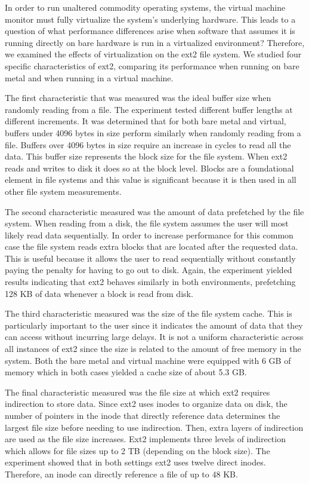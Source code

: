 \documentclass[letterpaper,twocolumn,10pt]{article}
\begin{document}
In order to run unaltered commodity operating systems, the virtual machine monitor must fully virtualize the system's underlying hardware.
This leads to a question of what performance differences arise when software that assumes it is running directly on bare hardware is run in a virtualized environment?
Therefore, we examined the effects of virtualization on the ext2 file system.
We studied four specific characteristics of ext2, comparing its performance when running on bare metal and when running in a virtual machine.

The first characteristic that was measured was the ideal buffer size when randomly reading from a file. 
The experiment tested different buffer lengths at different increments. 
It was determined that for both bare metal and virtual, buffers under 4096 bytes in size perform similarly when randomly reading from a file. 
Buffers over 4096 bytes in size require an increase in cycles to read all the data. 
This buffer size represents the block size for the file system. 
When ext2 reads and writes to disk it does so at the block level.
Blocks are a foundational element in file systems and this value is significant because it is then used in all other file system measurements.

The second characteristic measured was the amount of data prefetched by the file system. 
When reading from a disk, the file system assumes the user will most likely read data sequentially. 
In order to increase performance for this common case the file system reads extra blocks that are located after the requested data. 
This is useful because it allows the user to read sequentially without constantly paying the penalty for having to go out to disk. 
Again, the experiment yielded results indicating that ext2 behaves similarly in both environments, prefetching 128 KB of data whenever a block is read from disk.

The third characteristic measured was the size of the file system cache. 
This is particularly important to the user since it indicates the amount of data that they can access without incurring large delays. 
It is not a uniform characteristic across all instances of ext2 since the size is related to the amount of free memory in the system.
Both the bare metal and virtual machine were equipped with 6 GB of memory which in both cases yielded a cache size of about 5.3 GB. 

The final characteristic measured was the file size at which ext2 requires indirection to store data. 
Since ext2 uses inodes to organize data on disk, the number of pointers in the inode that directly reference data determines the largest file size before needing to use indirection. 
Then, extra layers of indirection are used as the file size increases. 
Ext2 implements three levels of indirection which allows for file sizes up to 2 TB (depending on the block size). 
The experiment showed that in both settings ext2 uses twelve direct inodes. 
Therefore, an inode can directly reference a file of up to 48 KB. 
\end{document}

